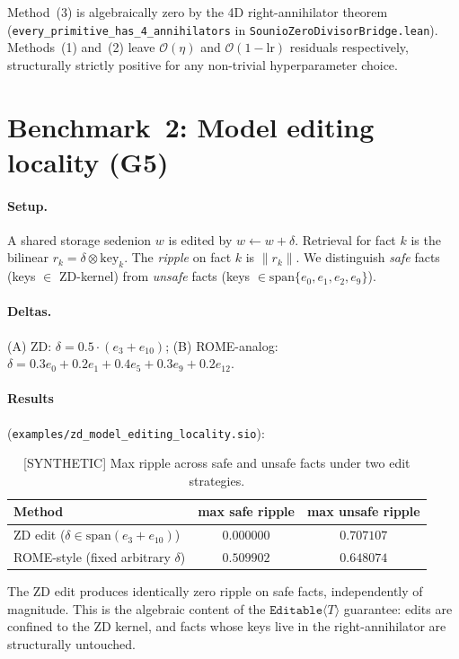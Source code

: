 \documentclass{article}
\newcommand{\Editable}[1]{\texttt{Editable}\langle #1 \rangle}
\begin{document}
Method~(3) is algebraically zero by the 4D right-annihilator theorem
(\texttt{every\_primitive\_has\_4\_annihilators} in
\texttt{SounioZeroDivisorBridge.lean}).  Methods~(1) and~(2) leave
$\mathcal{O}(\eta)$ and $\mathcal{O}(1-\mathrm{lr})$ residuals respectively,
structurally strictly positive for any non-trivial hyperparameter choice.

\section{Benchmark~2: Model editing locality (G5)}

\paragraph{Setup.}  A shared storage sedenion $w$ is edited by
$w \leftarrow w + \delta$.  Retrieval for fact $k$ is the bilinear
$r_k = \delta \otimes \text{key}_k$.  The \emph{ripple} on fact $k$ is
$\lVert r_k \rVert$.  We distinguish \emph{safe} facts
(keys $\in$ ZD-kernel) from \emph{unsafe} facts (keys $\in
\mathrm{span}\{e_0, e_1, e_2, e_9\}$).

\paragraph{Deltas.}  (A) ZD: $\delta = 0.5 \cdot (e_3 + e_{10})$;
(B) ROME-analog: $\delta = 0.3 e_0 + 0.2 e_1 + 0.4 e_5 + 0.3 e_9 + 0.2 e_{12}$.

\paragraph{Results} (\texttt{examples/zd\_model\_editing\_locality.sio}):

\begin{table}[h]
\centering
\caption{[SYNTHETIC] Max ripple across safe and unsafe facts under two edit strategies.}
\label{tab:editing}
\begin{tabular}{@{}lcc@{}}
\toprule
Method & max safe ripple & max unsafe ripple \\
\midrule
ZD edit (\mbox{$\delta \in \mathrm{span}(e_3+e_{10})$}) &
   $\mathbf{0.000000}$ & $0.707107$ \\
ROME-style (fixed arbitrary $\delta$)         & $0.509902$ &
   $0.648074$ \\
\bottomrule
\end{tabular}
\end{table}

The ZD edit produces identically zero ripple on safe facts, independently
of magnitude.  This is the algebraic content of the $\Editable{T}$ guarantee:
edits are confined to the ZD kernel, and facts whose keys live in the
right-annihilator are structurally untouched.
\end{document}
